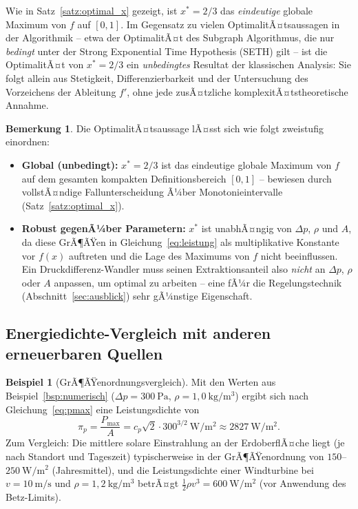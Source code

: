 ﻿\documentclass[a4paper,12pt]{article}
\theoremstyle{definition}
\newtheorem{beispiel}{Beispiel}
\newtheorem{bemerkung}{Bemerkung}
\begin{document}
Wie in Satz~\ref{satz:optimal_x} gezeigt, ist $x^\ast = 2/3$ das
\emph{eindeutige} globale Maximum von $f$ auf $[0,1]$. Im Gegensatz zu
vielen OptimalitÃ¤tsaussagen in der Algorithmik -- etwa der OptimalitÃ¤t des
Subgraph Algorithmus, die nur \emph{bedingt} unter der Strong Exponential
Time Hypothesis (SETH) gilt -- ist die OptimalitÃ¤t von $x^\ast = 2/3$ ein
\emph{unbedingtes} Resultat der klassischen Analysis: Sie folgt allein aus
Stetigkeit, Differenzierbarkeit und der Untersuchung des Vorzeichens der
Ableitung $f'$, ohne jede zusÃ¤tzliche komplexitÃ¤tstheoretische Annahme.

\begin{bemerkung}
	Die OptimalitÃ¤tsaussage lÃ¤sst sich wie folgt zweistufig einordnen:
	\begin{itemize}
		\item \textbf{Global (unbedingt):} $x^\ast = 2/3$ ist das
		eindeutige globale Maximum von $f$ auf dem gesamten kompakten
		Definitionsbereich $[0,1]$ -- bewiesen durch vollstÃ¤ndige
		Fallunterscheidung Ã¼ber Monotonieintervalle
		(Satz~\ref{satz:optimal_x}).
		\item \textbf{Robust gegenÃ¼ber Parametern:} $x^\ast$ ist
		unabhÃ¤ngig von $\Delta p$, $\rho$ und $A$, da diese GrÃ¶ÃŸen in
		Gleichung~\eqref{eq:leistung} als multiplikative Konstante vor
		$f(x)$ auftreten und die Lage des Maximums von $f$ nicht
		beeinflussen. Ein Druckdifferenz-Wandler muss seinen
		Extraktionsanteil also \emph{nicht} an $\Delta p$, $\rho$ oder
		$A$ anpassen, um optimal zu arbeiten -- eine fÃ¼r die
		Regelungstechnik (Abschnitt~\ref{sec:ausblick}) sehr gÃ¼nstige
		Eigenschaft.
	\end{itemize}
\end{bemerkung}

\subsection{Energiedichte-Vergleich mit anderen erneuerbaren Quellen}

\begin{beispiel}[GrÃ¶ÃŸenordnungsvergleich]
	\label{bsp:vergleich}
	Mit den Werten aus Beispiel~\ref{bsp:numerisch} ($\Delta p = 300\
	\mathrm{Pa}$, $\rho = 1{,}0\ \mathrm{kg/m^3}$) ergibt sich nach
	Gleichung~\eqref{eq:pmax} eine Leistungsdichte von
	\[
		\pi_p = \frac{P_{\max}}{A}
		= c_p \sqrt{2}\cdot 300^{3/2}\ \mathrm{W/m^2}
		\approx 2827\ \mathrm{W/m^2}.
	\]
	Zum Vergleich: Die mittlere solare Einstrahlung an der
	ErdoberflÃ¤che liegt (je nach Standort und Tageszeit) typischerweise
	in der GrÃ¶ÃŸenordnung von $150$--$250\ \mathrm{W/m^2}$ (Jahresmittel),
	und die Leistungsdichte einer Windturbine bei $v = 10\ \mathrm{m/s}$
	und $\rho = 1{,}2\ \mathrm{kg/m^3}$ betrÃ¤gt
	$\tfrac{1}{2}\rho v^3 = 600\ \mathrm{W/m^2}$ (vor Anwendung des
	Betz-Limits).
\end{beispiel}
\end{document}
